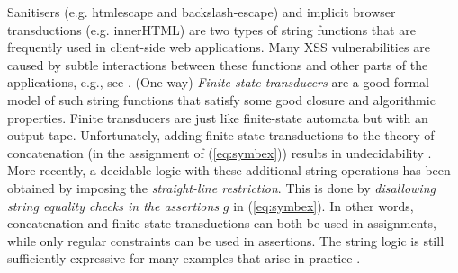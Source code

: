 
Sanitisers (e.g. htmlescape and backslash-escape)
and implicit browser transductions (e.g. innerHTML)
are two types of string functions that are frequently used in client-side
web applications. Many XSS vulnerabilities are caused by
subtle interactions between these functions and other parts of the
applications, e.g., see \cite{web-model,Kern14,DV13,LB16,mXSS}. 
(One-way) \emph{Finite-state transducers} 
\cite{BEK,web-model,DV13,symbolic-transducer,LB16}
are a good formal model of such string functions that satisfy some
good closure and algorithmic properties. 
Finite transducers are just like
finite-state automata but with an output tape.
Unfortunately, adding finite-state transductions to
the theory of concatenation (in the assignment of (\ref{eq:symbex})) results in 
undecidability \cite{LB16}.
More recently, a decidable logic with these additional string 
operations \cite{LB16} has been obtained by imposing 
the \emph{straight-line restriction}. %
This is done 
by \emph{disallowing string equality checks in the assertions} $g$ in 
(\ref{eq:symbex}). In other words, concatenation and finite-state transductions
can both be used in assignments, while only regular constraints can be used in
assertions. The string logic is still 
sufficiently expressive
for many examples that arise in practice \cite{LB16,HJLRV18}.




